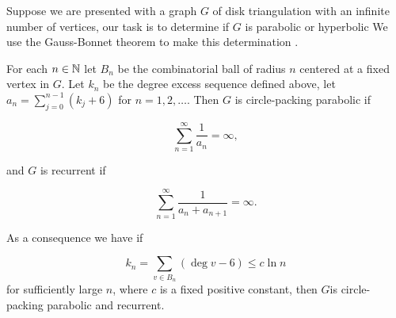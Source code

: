 Suppose we are presented with a graph $G$ of disk triangulation with an infinite 
number of vertices, our task is to determine if $G$ is parabolic or hyperbolic
We use the Gauss-Bonnet theorem to make this determination \cite{oh_criteria_2022}.

For each $n\in\mathbb{N}$ let $B_n$ be the combinatorial ball of radius $n$
centered at a fixed vertex in $G.$ Let $k_n$ be the degree excess sequence
defined above, let $a_n=\sum_{j=0}^{n-1}(k_j+6)$ for $n=1,2,\ldots$.
Then $G$ is circle-packing parabolic if 

\begin{equation}\label{eqn:cp-parabolic}
\sum_{n=1}^{\infty}\frac{1}{a_n}=\infty,
\end{equation}

and $G$ is recurrent if

\begin{equation}\label{eqn:recurrent}
\sum_{n=1}^{\infty}\frac{1}{a_n+a_{n+1}}=\infty.
\end{equation}

As a consequence we have if

$$k_n=\sum_{v\in B_n}(\deg v -6)\leq c\ln n$$
for sufficiently large $n$, where $c$ is a fixed positive constant,
then $G$is circle-packing parabolic and recurrent.
